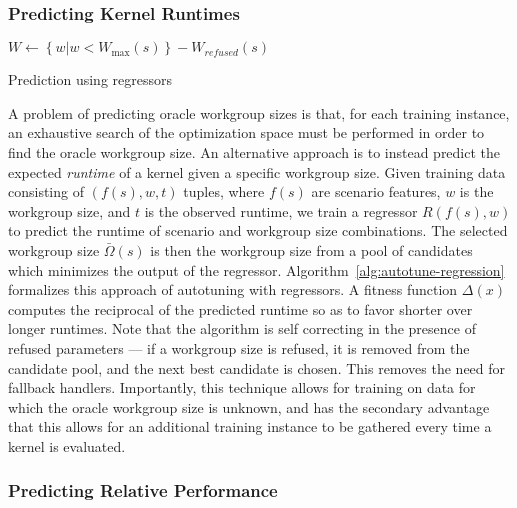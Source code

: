   \subsubsection{Predicting Kernel Runtimes}

  \begin{algorithm}[t]
    \SetAlgoLined

    $W \leftarrow \left\{ w | w < W_{\max}(s) \right\} - W_{refused}(s)$\;
    \caption{Prediction using regressors}
    \label{alg:autotune-regression}
  \end{algorithm}

  A problem of predicting oracle workgroup sizes is that, for each
  training instance, an exhaustive search of the optimization space must
  be performed in order to find the oracle workgroup size. An
  alternative approach is to instead predict the expected \emph{runtime}
  of a kernel given a specific workgroup size. Given training data
  consisting of $(f(s),w,t)$ tuples, where $f(s)$ are scenario features,
  $w$ is the workgroup size, and $t$ is the observed runtime, we train a
  regressor $R(f(s), w)$ to predict the runtime of scenario and
  workgroup size combinations. The selected workgroup size
  $\bar{\Omega}(s)$ is then the workgroup size from a pool of candidates
  which minimizes the output of the
  regressor. Algorithm~\ref{alg:autotune-regression} formalizes this
  approach of autotuning with regressors. A fitness function $\Delta(x)$
  computes the reciprocal of the predicted runtime so as to favor
  shorter over longer runtimes. Note that the algorithm is self
  correcting in the presence of refused parameters --- if a workgroup
  size is refused, it is removed from the candidate pool, and the next
  best candidate is chosen. This removes the need for fallback
  handlers. Importantly, this technique allows for training on data for
  which the oracle workgroup size is unknown, and has the secondary
  advantage that this allows for an additional training instance to be
  gathered every time a kernel is evaluated.


  \subsubsection{Predicting Relative Performance}


